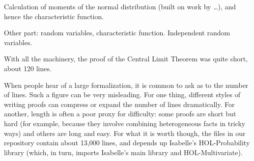 \documentclass{article}
\begin{document}
Calculation of moments of the normal distribution (built on work by \ldots), and hence the characteristic function.

Other part: random variables, characteristic function. Independent random variables. 

With all the machinery, the proof of the Central Limit Theorem was quite short, about 120 lines. 

When people hear of a large formalization, it is common to ask as to the number of lines. Such a figure can be very misleading. For one thing, different styles of writing proofs can compress or expand the number of lines dramatically. For another, length is often a poor proxy for difficulty: some proofs are short but hard (for example, because they involve combining heterogeneous facts in tricky ways) and others are long and easy. For what it is worth though, the files in our repository contain about 13,000 lines, and depends up Isabelle's HOL-Probability library (which, in turn, imports Isabelle's main library and HOL-Multivariate).
\end{document}
